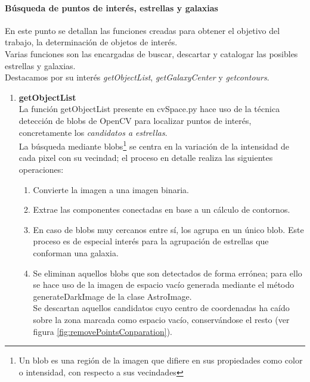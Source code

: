 	\paragraph{Búsqueda de puntos de interés, estrellas y galaxias}
	En este punto se detallan las funciones creadas para obtener el objetivo del trabajo, la determinación de objetos de interés.
	\\Varias funciones son las encargadas de buscar, descartar y catalogar las posibles estrellas y galaxias.\\
	Destacamos por su interés \emph{getObjectList}, \emph{getGalaxyCenter} y \emph{getcontours}.\\
	\begin{enumerate}
	\item \textbf{getObjectList}\\
	La función getObjectList presente en cvSpace.py hace uso de la técnica detección de blobs de OpenCV \cite{OpenCV} para localizar puntos de interés, concretamente los \textit{candidatos a estrellas}.\\
	La búsqueda mediante blobs\footnote{Un blob es una región de la imagen que difiere en sus propiedades como color o intensidad, con respecto a sus vecindades} se centra en la variación de la intensidad de cada pixel con su vecindad; el proceso en detalle realiza las siguientes operaciones:
	\begin{enumerate}
		\item Convierte la imagen a una imagen binaria.
		\item Extrae las componentes conectadas en base a un cálculo de contornos.
		\item En caso de blobs muy cercanos entre sí, los agrupa en un único blob. Este proceso  es de especial interés para la agrupación de estrellas que conforman una galaxia.
		\item Se eliminan aquellos blobs que son detectados de forma errónea; para ello se hace uso de la imagen de espacio vacío generada mediante el método {\scriptsize generateDarkImage} de la clase AstroImage.\\
		Se descartan aquellos candidatos cuyo centro de coordenadas ha caído sobre la zona marcada como espacio vacío, conservándose el resto (ver figura \ref{fig:removePointsConparation}).
		\begin{figure}[!htb]
			\centering

\end{figure}
\end{enumerate}
\end{enumerate}

